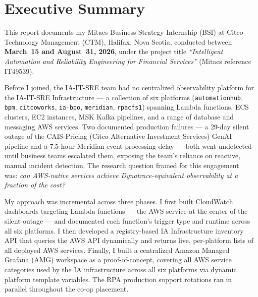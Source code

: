 ﻿%

\chapter{Executive Summary}
\label{chap:executive_summary}

This report documents my Mitacs Business Strategy Internship (BSI)
at Citco Technology Management (CTM), Halifax, Nova Scotia, conducted between
\textbf{March~15 and August~31, 2026}, under the project title
\textit{``Intelligent Automation and Reliability Engineering for Financial
Services''} (Mitacs reference IT49539).

Before I joined, the IA-IT-SRE team had no centralized observability platform
for the IA-IT-SRE Infrastructure --- a collection of six platforms
(\texttt{automationhub}, \texttt{bpm}, \texttt{citcoworks}, \texttt{ia-bpo},
\texttt{meridian}, \texttt{rpacfs1}) spanning Lambda functions, ECS clusters,
EC2 instances, MSK Kafka pipelines, and a range of database and messaging AWS
services. Two documented production failures --- a 29-day silent outage of the
CAIS-Pricing (Citco Alternative Investment Services) GenAI pipeline and a 7.5-hour Meridian event processing
delay --- both went undetected until business teams escalated them,
exposing the team's reliance on reactive, manual incident detection. The
research question framed for this engagement was: \textit{can AWS-native
services achieve Dynatrace-equivalent observability at a fraction of the cost?}

My approach was incremental across three phases. I first built CloudWatch
dashboards targeting Lambda functions --- the AWS service at the center of the
silent outage --- and documented each function's trigger type and runtime across
all six platforms. I then developed a
registry-based IA Infrastructure inventory API that queries the AWS
API dynamically and returns live, per-platform lists of all deployed AWS
services. Finally, I built a centralized Amazon
Managed Grafana (AMG) workspace as a proof-of-concept, covering all AWS
service categories used by the IA infrastructure across all six platforms via dynamic platform template
variables. The RPA production support rotations ran in parallel
throughout the co-op placement.

